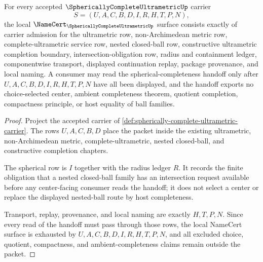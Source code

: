 \begin{theorem}
\label{thm:spherically-complete-ultrametric-namecert-obligations}
For every accepted $\SphericallyCompleteUltrametricUp$ carrier
$$
S=(U,A,C,B,D,I,R,H,T,P,N),
$$
the local $\NameCert_{\SphericallyCompleteUltrametricUp}$ surface consists exactly of carrier admission for the ultrametric row, non-Archimedean metric row, complete-ultrametric service row, nested closed-ball row, constructive ultrametric completion boundary, intersection-obligation row, radius and containment ledger, componentwise transport, displayed continuation replay, package provenance, and local naming. A consumer may read the spherical-completeness handoff only after $U,A,C,B,D,I,R,H,T,P,N$ have all been displayed, and the handoff exports no choice-selected center, ambient completeness theorem, quotient completion, compactness principle, or host equality of ball families.
\end{theorem}
\begin{proof}
Project the accepted carrier of \autoref{def:spherically-complete-ultrametric-carrier}. The rows $U,A,C,B,D$ place the packet inside the existing ultrametric, non-Archimedean metric, complete-ultrametric, nested closed-ball, and constructive completion chapters.

The spherical row is $I$ together with the radius ledger $R$. It records the finite obligation that a nested closed-ball family has an intersection request available before any center-facing consumer reads the handoff; it does not select a center or replace the displayed nested-ball route by host completeness.

Transport, replay, provenance, and local naming are exactly $H,T,P,N$. Since every read of the handoff must pass through those rows, the local NameCert surface is exhausted by $U,A,C,B,D,I,R,H,T,P,N$, and all excluded choice, quotient, compactness, and ambient-completeness claims remain outside the packet.
\end{proof}



